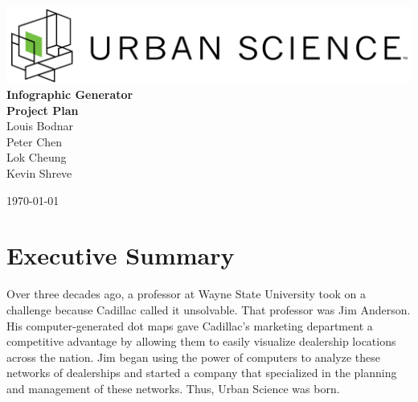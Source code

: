 \documentclass[11pt,a4paper,oneside]{article}
\begin{document}
\begin{titlepage}



\begin{center}

\includegraphics[width=1\textwidth]{images/sponsor-logo.png}\\[1cm]    

{ \huge \bfseries Infographic Generator}\\[0.4cm]
{ \large \bfseries Project Plan}\\[0.4cm]

Louis Bodnar\\
Peter Chen\\
Lok Cheung\\
Kevin Shreve\\



\vfill

{\large \today}

\end{center}

\end{titlepage}

\tableofcontents

\newpage

\listoffigures

\newpage

\section{Executive Summary}


Over three decades ago, a professor at Wayne State University took on a challenge because Cadillac called it unsolvable.  That professor was Jim Anderson.  His computer-generated dot maps gave Cadillac's marketing department a competitive advantage by allowing them to easily visualize dealership locations across the nation.  Jim began using the power of computers to analyze these networks of dealerships and started a company that specialized in the planning and management of these networks.  Thus, Urban Science was born.\\
\end{document}
